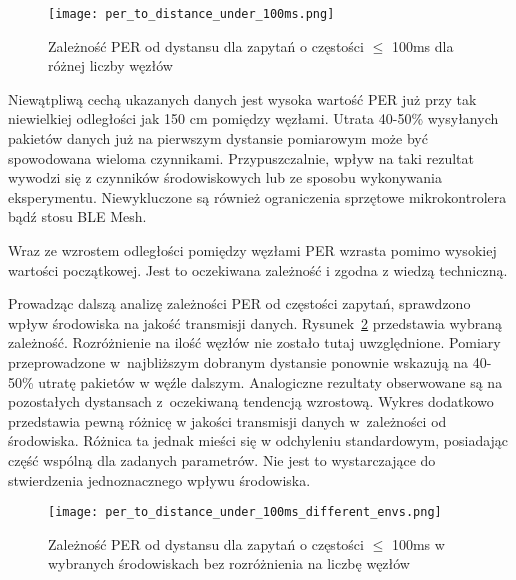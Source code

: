 \begin{figure}[!htb]
	\centering \texttt{[image: per\_to\_distance\_under\_100ms.png]}
	\caption{Zależność \gls{PER} od dystansu dla zapytań o częstości $\leqslant$ 100ms dla różnej liczby węzłów}
	\label{rys:per_to_distance_under_100ms}
\end{figure}

Niewątpliwą cechą ukazanych danych jest wysoka wartość PER już przy tak niewielkiej odległości jak 150 cm pomiędzy węzłami.
Utrata 40-50\% wysyłanych pakietów danych już na pierwszym dystansie pomiarowym może być spowodowana wieloma czynnikami.
Przypuszczalnie, wpływ na taki rezultat wywodzi się z czynników środowiskowych lub ze sposobu wykonywania 
eksperymentu. Niewykluczone są również ograniczenia sprzętowe mikrokontrolera bądź stosu BLE Mesh.

Wraz ze wzrostem odległości pomiędzy węzłami PER wzrasta pomimo wysokiej wartości początkowej. Jest to 
oczekiwana zależność i zgodna z wiedzą techniczną.

Prowadząc dalszą analizę zależności PER od częstości zapytań, sprawdzono wpływ środowiska na jakość transmisji danych.
Rysunek~\ref{rys:per_to_distance_under_100ms_different_envs} przedstawia wybraną zależność. Rozróżnienie
na ilość węzłów nie zostało tutaj uwzględnione. Pomiary przeprowadzone w~najbliższym dobranym dystansie ponownie 
wskazują na 40-50\% utratę pakietów w węźle dalszym. Analogiczne rezultaty obserwowane są na pozostałych dystansach 
z~oczekiwaną tendencją wzrostową.
Wykres dodatkowo przedstawia pewną różnicę w jakości transmisji danych w~zależności od środowiska. Różnica ta 
jednak mieści się w odchyleniu standardowym, posiadając część wspólną dla zadanych parametrów. Nie jest to 
wystarczające do stwierdzenia jednoznacznego wpływu środowiska.

\begin{figure}[!htb]
	\centering \texttt{[image: per\_to\_distance\_under\_100ms\_different\_envs.png]} 
	\caption{Zależność \gls{PER} od dystansu dla zapytań o częstości $\leqslant$ 100ms w wybranych środowiskach bez rozróżnienia na liczbę węzłów}
	\label{rys:per_to_distance_under_100ms_different_envs}
\end{figure}


